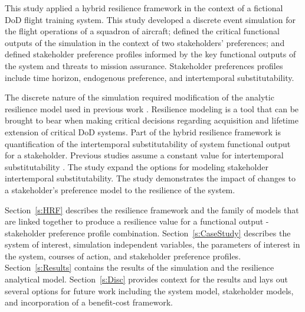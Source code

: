 This study applied a hybrid resilience framework
\cite{Ayyub2014,Ayyub2015,Emanuel2017,Emanuel2018} in the context of
a fictional DoD flight training system. This study developed a
discrete event simulation for the flight operations of a squadron of
aircraft; defined the critical functional outputs of the simulation
in the context of two stakeholders' preferences; and defined
stakeholder preference profiles informed by the key functional outputs
of the system and threats to mission assurance. Stakeholder
preferences profiles include
time horizon, endogenous preference, and intertemporal
substitutability.

The discrete nature of the simulation required
modification of the analytic resilience model used in previous work
\cite{Ayyub2014,Ayyub2015,Emanuel2017,Emanuel2018}.  
Resilience modeling is a tool that can be brought to bear when making 
critical decisions regarding acquisition and lifetime extension of
critical DoD systems. Part of the
hybrid resilience framework is quantification of 
the intertemporal substitutability of system functional output for a
stakeholder. Previous studies  assume a
constant value for intertemporal substitutability
\cite{Emanuel2017,Emanuel2018}. The study  expand the options for
modeling stakeholder intertemporal substitutability. The study
demonstrates the impact of changes to a stakeholder's preference model
to the resilience of the system. 


Section~\ref{s:HRF} describes the
resilience framework and the family of models that are linked
together to produce a resilience value for a functional output -
stakeholder preference profile combination. Section~\ref{s:CaseStudy}
describes the system of interest, simulation independent variables, the parameters of
interest in the system, courses of action, and stakeholder preference
profiles. Section~\ref{s:Results} contains the results of the 
simulation and the resilience analytical model. Section~\ref{s:Disc}
provides context for the results and lays out several options for
future work including the system model, stakeholder
models, and incorporation of a benefit-cost framework. 



